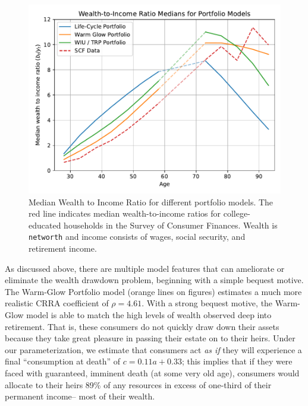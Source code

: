 \documentclass{article}
\newcommand{\CRRA}{\rho}
\newcommand{\cNrm}{c}
\newcommand{\aNrm}{a}
\begin{document}
\begin{figure}[!htbp]
\centering
\includegraphics[width=0.7\linewidth]{files/WealthMomentFit-c69965a6e7d123345378d895b8f0b2a6.pdf}
\caption[]{Median Wealth to Income Ratio for different portfolio models. The red line indicates median wealth-to-income ratios for college-educated households in the Survey of Consumer Finances. Wealth is \texttt{networth} and income consists of wages, social security, and retirement income.}
\label{medwealth}
\end{figure}

As discussed above, there are multiple model features that can ameliorate or eliminate the wealth drawdown problem, beginning with a simple bequest motive.
The Warm-Glow Portfolio model (orange lines on figures) estimates a much more realistic CRRA coefficient of $\CRRA = 4.61$.
With a strong bequest motive, the Warm-Glow model is able to match the high levels of wealth observed deep into retirement.
That is, these consumers do not quickly draw down their assets because they take great pleasure in passing their estate on to their heirs.
Under our parameterization, we estimate that consumers act \textit{as if} they will experience a final ``consumption at death'' of $\cNrm = 0.11 \aNrm + 0.33$;
this implies that if they were faced with guaranteed, imminent death (at some very old age), consumers would allocate to their heirs 89\% of any resources in excess of one-third of their permanent income-- most of their wealth.
\end{document}
